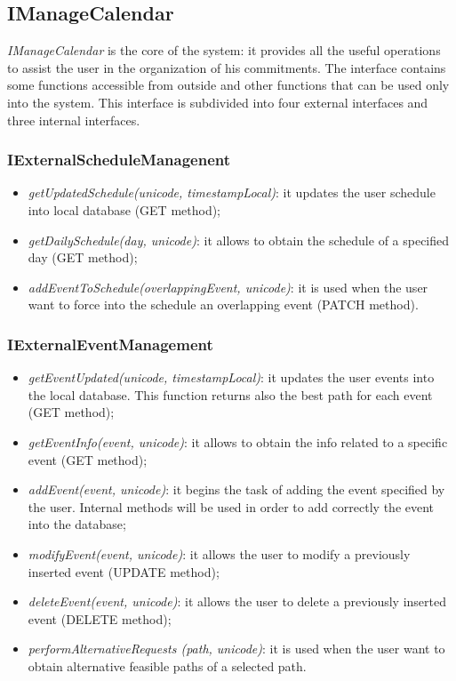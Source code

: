 \subsection{IManageCalendar}
\label{subsect: IManageCalendar}
\textit{IManageCalendar} is the core of the system: it provides all the useful operations to assist the user in the organization of his commitments. The interface contains some functions accessible from outside and other functions that can be used only into the system. This interface is subdivided into four external interfaces and three internal interfaces.

\subsubsection{IExternalScheduleManagenent}
\begin{itemize}
\item \textit{getUpdatedSchedule(unicode, timestampLocal)}: it updates the user schedule into local database (GET method);
\item \textit{getDailySchedule(day, unicode)}: it allows to obtain the schedule of a specified day (GET method);
\item \textit{addEventToSchedule(overlappingEvent, unicode)}: it is used when the user want to force into the schedule an overlapping event (PATCH method). 
\end{itemize}
\subsubsection{IExternalEventManagement}
\begin{itemize}
\item \textit{getEventUpdated(unicode, timestampLocal)}: it updates the user events into the local database. This function returns also the best path for each event (GET method);
\item \textit{getEventInfo(event, unicode)}: it allows to obtain the info related to a specific event (GET method);
\item \textit{addEvent(event, unicode)}: it begins the task of adding the event specified by the user. Internal methods will be used in order to add correctly the event into the database;
\item \textit{modifyEvent(event, unicode)}: it allows the user to modify a previously inserted event (UPDATE method);
\item \textit{deleteEvent(event, unicode)}: it allows the user to delete a previously inserted event (DELETE method);
\item \textit{performAlternativeRequests (path, unicode)}: it is used when the user want to obtain alternative feasible paths of a selected path.
\end{itemize}
